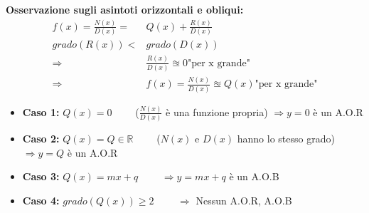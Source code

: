 \documentclass[../main.tex]{subfiles}
\begin{document}
\textbf{Osservazione sugli asintoti orizzontali e obliqui:}
\begin{align*}
    f(x) = \frac{N(x)}{D(x)} =& Q(x) + \frac{R(x)}{D(x)} \\
    grado(R(x)) <& grado(D(x)) \\
    \Rightarrow& \frac{R(x)}{D(x)}\approxeq 0 \text{"per x grande"} \\
    \Rightarrow& f(x) = \frac{N(x)}{D(x)}\approxeq Q(x) \text{"per x grande"}
\end{align*}

\vspace{0.5cm}
\begin{itemize}
    \item \textbf{Caso 1:} $Q(x) = 0 \phantom{--}$ ($\frac{N(x)}{D(x)}$ è una funzione propria)
    $\Rightarrow y = 0$ è un A.O.R
    \item \textbf{Caso 2:} $Q(x) = Q \in \mathbb{R} \phantom{--}$ ($N(x)$ e $D(x)$ hanno lo stesso grado)
    $\Rightarrow y =Q$ è un A.O.R
    \item \textbf{Caso 3:} $Q(x) = mx+q \phantom{--}$
    $\Rightarrow y = mx+q$ è un A.O.B
    \item \textbf{Caso 4:} $grado(Q(x)) \geq 2 \phantom{--}$
    $\Rightarrow$ Nessun A.O.R, A.O.B 
\end{itemize}
\end{document}
